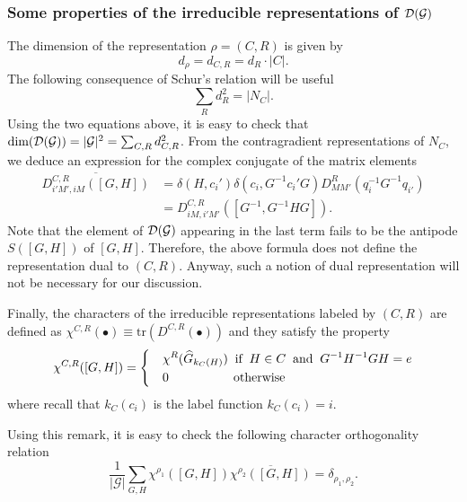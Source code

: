 \documentclass[nofootinbib,superscriptaddress,eqsecnum,tightenlines,11pt]{revtex4-1}
\def\nn{\nonumber}
\def\mG{\mathcal{G}}
\def\be{\begin{equation}}
\def\ee{\end{equation}}
\begin{document}
\subsubsection{Some properties of the irreducible representations of ${\cal D}(\mG)$\label{sec_relationsdouble}}

The dimension of the representation $\rho=(C,R)$ is given by
\be
d_\rho = d_{C,R}=d_R \cdot|C|.
\ee
The following consequence of Schur's relation will be useful
\be
	\sum_R d_R^2 = |N_C|.
\ee
Using the two equations above, it is easy to check that $\text{dim}({\cal D}(\mG)) = |\mG|^2 =  \sum_{C,R} d^2_{C,R}$.
From the contragradient representations of $N_C$, we deduce an expression for the complex conjugate of the matrix elements
\begin{align} \nn
	\overline{D^{C,R}_{i'M',iM}([G,H])} &= \delta(H,c_i')\delta(c_i,G^{-1}c_i'G)D^R_{MM'}(q_i^{-1}G^{-1}q_{i'}) \\
	&= D^{C,R}_{iM,i'M'}([G^{-1},G^{-1}HG]) \label{contra}.
\end{align}
Note that the element of ${\cal D}(\mG)$ appearing in the last term fails to be the antipode $S([G,H])$ of $[G,H]$.
Therefore, the above formula does not define the representation dual to $(C,R)$. 
Anyway, such a notion of dual representation will not be necessary for our discussion.


Finally, the characters of the irreducible representations labeled by $(C,R)$ are defined as $\chi^{C,R}( {\scriptstyle \bullet}) \equiv \text{tr}( D^{C,R}( {\scriptstyle \bullet}))$ and they satisfy the property
\be
	\chi^{C,R}([G,H]) =
	\begin{dcases}
		&\chi^R(\widehat G_{k_C(H)})\;\;\text{if}\;\; H \in C \;\;\text{and}\;\; G^{-1}H^{-1}GH = e \\
		&0  \qquad\qquad\quad\, \text{otherwise} \\
	\end{dcases}
\ee
where recall that $k_C(c_i)$ is the label function $k_C(c_i)=i$.

Using this remark, it is easy to check the following character orthogonality relation \cite{Verlinde}
\be
	\frac{1}{|\mathcal{G}|}\sum_{G,H } \chi^{\rho_1}([G,H])\overline{\chi^{\rho_2}([G,H])} = \delta_{\rho_1,\rho_2}. %
	\label{orthoChar}
\ee
\end{document}

